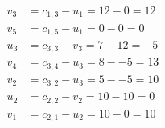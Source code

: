 \[
\begin{aligned}
v_{3} &= c_{1,3} - u_{1} = 12 - 0 = 12 \\
v_{5} &= c_{1,5} - u_{1} = 0 - 0 = 0 \\
u_{3} &= c_{3,3} - v_{3} = 7 - 12 = -5 \\
v_{4} &= c_{3,4} - u_{3} = 8 - -5 = 13 \\
v_{2} &= c_{3,2} - u_{3} = 5 - -5 = 10 \\
u_{2} &= c_{2,2} - v_{2} = 10 - 10 = 0 \\
v_{1} &= c_{2,1} - u_{2} = 10 - 0 = 10 \\
\end{aligned}
\]

